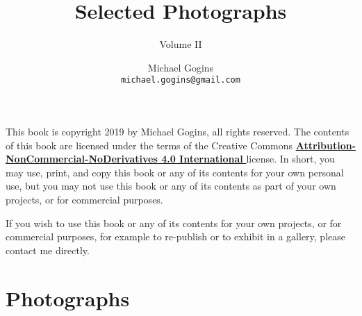 

\frontmatter
\title{Selected Photographs}
\author{Michael Gogins \\ \texttt{michael.gogins@gmail.com}}
\subtitle{Volume II}
\dedication{This book is for Mick.}
\newpage
\noindent This book is copyright 2019 by Michael Gogins, all rights reserved. The contents of this book are licensed under the terms of the Creative Commons \href{https://creativecommons.org/licenses/by-nc-nd/4.0/legalcode}{\textbf{Attribution-NonCommercial-NoDerivatives 4.0 International} } license. In short, you may use, print, and copy this book or any of its contents for your own personal use, but you may not use this book or any of its contents as part of your own projects, or for commercial purposes.

If you wish to use this book or any of its contents for your own projects, or for commercial purposes, for example to re-publish or to exhibit in a gallery, please contact me directly.
\maketitle

\tableofcontents
\listoffigures

\mainmatter
{}

\chapter{Photographs}



